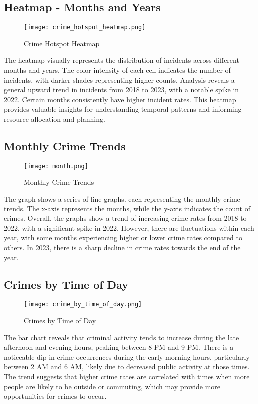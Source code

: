 \documentclass{article}
\begin{document}
\subsection{Heatmap - Months and Years}
\begin{figure}[H]
    \centering
    \texttt{[image: crime\_hotspot\_heatmap.png]}
    \caption{Crime Hotspot Heatmap}
    \label{fig:crime_hotspot_heatmap}
\end{figure}
The heatmap visually represents the distribution of incidents across different months and years. The color intensity of each cell indicates the number of incidents, with darker shades representing higher counts. Analysis reveals a general upward trend in incidents from 2018 to 2023, with a notable spike in 2022. Certain months consistently have higher incident rates. This heatmap provides valuable insights for understanding temporal patterns and informing resource allocation and planning.


\subsection{Monthly Crime Trends}
\begin{figure}[H]
    \centering
    \texttt{[image: month.png]}
    \caption{Monthly Crime Trends}
    \label{fig:monthly_crime_trends}
\end{figure}
The graph shows a series of line graphs, each representing the monthly crime trends. The x-axis represents the months, while the y-axis indicates the count of crimes. Overall, the graphs show a trend of increasing crime rates from 2018 to 2022, with a significant spike in 2022. However, there are fluctuations within each year, with some months experiencing higher or lower crime rates compared to others. In 2023, there is a sharp decline in crime rates towards the end of the year.


\subsection{Crimes by Time of Day}
\begin{figure}[H]
    \centering
    \texttt{[image: crime\_by\_time\_of\_day.png]}
    \caption{Crimes by Time of Day}
    \label{fig:crime_by_time_of_day}
\end{figure}
The bar chart reveals that criminal activity tends to increase during the late afternoon and evening hours, peaking between 8 PM and 9 PM. There is a noticeable dip in crime occurrences during the early morning hours, particularly between 2 AM and 6 AM, likely due to decreased public activity at those times. The trend suggests that higher crime rates are correlated with times when more people are likely to be outside or commuting, which may provide more opportunities for crimes to occur.
\end{document}
